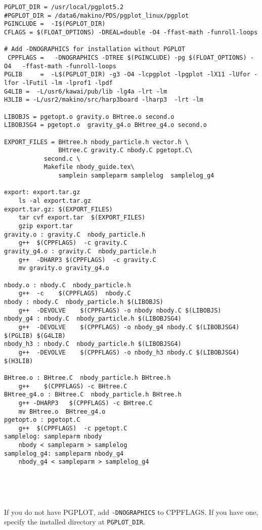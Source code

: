 \begin{verbatim}
PGPLOT_DIR = /usr/local/pgplot5.2
#PGPLOT_DIR = /data6/makino/PDS/pgplot_linux/pgplot
PGINCLUDE =  -I$(PGPLOT_DIR)
CFLAGS = $(FLOAT_OPTIONS) -DREAL=double -O4 -ffast-math -funroll-loops

# Add -DNOGRAPHICS for installation without PGPLOT
 CPPFLAGS =   -DNOGRAPHICS -DTREE $(PGINCLUDE) -pg $(FLOAT_OPTIONS) -O4   -ffast-math -funroll-loops
PGLIB     =  -L$(PGPLOT_DIR) -g3 -O4 -lcpgplot -lpgplot -lX11 -lUfor -lfor -lFutil -lm -lprof1 -lpdf
G4LIB =  -L/usr6/kawai/pub/lib -lg4a -lrt -lm
H3LIB = -L/usr2/makino/src/harp3board -lharp3  -lrt -lm 

LIBOBJS = pgetopt.o gravity.o BHtree.o second.o
LIBOBJSG4 = pgetopt.o  gravity_g4.o BHtree_g4.o second.o

EXPORT_FILES = BHtree.h nbody_particle.h vector.h \
               BHtree.C	gravity.C nbody.C pgetopt.C\
	       second.c \
	       Makefile nbody_guide.tex\
               samplein sampleparm samplelog  samplelog_g4 

export: export.tar.gz
	ls -al export.tar.gz
export.tar.gz: $(EXPORT_FILES)
	tar cvf export.tar  $(EXPORT_FILES)
	gzip export.tar 
gravity.o : gravity.C  nbody_particle.h
	g++  $(CPPFLAGS)  -c gravity.C
gravity_g4.o : gravity.C  nbody_particle.h
	g++  -DHARP3 $(CPPFLAGS)  -c gravity.C
	mv gravity.o gravity_g4.o

nbody.o : nbody.C  nbody_particle.h
	g++  -c    $(CPPFLAGS)  nbody.C 
nbody : nbody.C  nbody_particle.h $(LIBOBJS)
	g++  -DEVOLVE    $(CPPFLAGS) -o nbody nbody.C $(LIBOBJS) 
nbody_g4 : nbody.C  nbody_particle.h $(LIBOBJSG4)
	g++  -DEVOLVE    $(CPPFLAGS) -o nbody_g4 nbody.C $(LIBOBJSG4) $(PGLIB) $(G4LIB)
nbody_h3 : nbody.C  nbody_particle.h $(LIBOBJSG4)
	g++  -DEVOLVE    $(CPPFLAGS) -o nbody_h3 nbody.C $(LIBOBJSG4) $(H3LIB)

BHtree.o : BHtree.C  nbody_particle.h BHtree.h 
	g++    $(CPPFLAGS) -c BHtree.C 
BHtree_g4.o : BHtree.C  nbody_particle.h BHtree.h 
	g++ -DHARP3   $(CPPFLAGS) -c BHtree.C
	mv BHtree.o  BHtree_g4.o 
pgetopt.o : pgetopt.C  
	g++  $(CPPFLAGS)  -c pgetopt.C
samplelog: sampleparm nbody
	nbody < sampleparm > samplelog
samplelog_g4: sampleparm nbody_g4
	nbody_g4 < sampleparm > samplelog_g4





\end{verbatim}

If you do not have PGPLOT, add {\tt -DNOGRAPHICS} to CPPFLAGS. If you
have one, specify the installed directory at {\tt PGPLOT\_DIR}.

